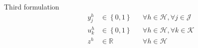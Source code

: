 \documentclass[utf8,aspectratio=169,ngerman,english]{beamer}
\begin{document}
\begin{frame}{Third formulation}
\begin{subequations}
\begin{align}
            &       &&              &                           y_{j}^h                                     &\in    \left \{0, 1 \right \}  &&\forall h \in \mathcal{H}, \forall j \in \mathcal{J}                                              \label{eq:nEpCP-ybin}       \\[-1mm]
            &       &&              &                           u^{h}_k                                     &\in    \left \{0, 1 \right \}  &&\forall h \in \mathcal{H}, \forall k \in \mathcal{K}                                              \label{eq:nEpCP-ubin}       \\[-1mm]
            &       &&              &                           z^h                                         &\in    \mathbb{R}              &&\forall h \in \mathcal{H}                                                                         \label{eq:nEpCP-Rreal}      
        \end{align}
    \end{subequations}
\end{frame}
\end{document}
